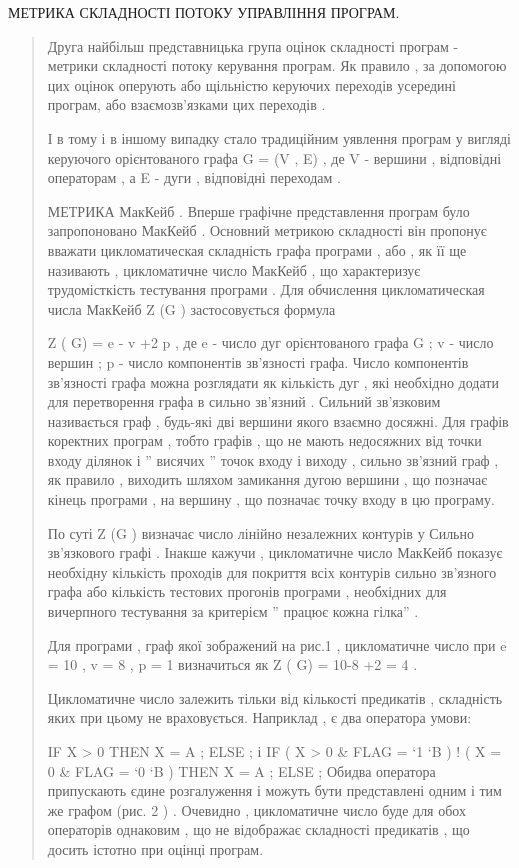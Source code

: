 МЕТРИКА СКЛАДНОСТІ ПОТОКУ УПРАВЛІННЯ ПРОГРАМ.
\begin{quote}

Друга найбільш представницька група оцінок складності програм - метрики складності потоку керування програм. Як правило , за допомогою цих оцінок оперують або щільністю керуючих переходів усередині програм, або взаємозв'язками цих переходів .

І в тому і в іншому випадку стало традиційним уявлення програм у вигляді керуючого орієнтованого графа G = (V , E) , де V - вершини , відповідні операторам , а E - дуги , відповідні переходам .

МЕТРИКА МакКейб .
Вперше графічне представлення програм було запропоновано МакКейб . Основний метрикою складності він пропонує вважати цикломатическая складність графа програми , або , як її ще називають , цикломатичне число МакКейб , що характеризує трудомісткість тестування програми .
Для обчислення цикломатическая числа МакКейб Z (G ) застосовується формула

Z ( G) = e - v +2 p ,
де e - число дуг орієнтованого графа G ;
v - число вершин ;
p - число компонентів зв'язності графа.
Число компонентів зв'язності графа можна розглядати як кількість дуг , які необхідно додати для перетворення графа в сильно зв'язний . Сильний зв'язковим називається граф , будь-які дві вершини якого взаємно досяжні. Для графів коректних програм , тобто графів , що не мають недосяжних від точки входу ділянок і '' висячих '' точок входу і виходу , сильно зв'язний граф , як правило , виходить шляхом замикання дугою вершини , що позначає кінець програми , на вершину , що позначає точку входу в цю програму.

По суті Z (G ) визначає число лінійно незалежних контурів у Сильно зв'язкового графі . Інакше кажучи , цикломатичне число МакКейб показує необхідну кількість проходів для покриття всіх контурів сильно зв'язного графа або кількість тестових прогонів програми , необхідних для вичерпного тестування за критерієм '' працює кожна гілка'' .

Для програми , граф якої зображений на рис.1 , цикломатичне число при e = 10 , v = 8 , p = 1 визначиться як Z ( G) = 10-8 +2 = 4 .

Цикломатичне число залежить тільки від кількості предикатів , складність яких при цьому не враховується. Наприклад , є два оператора умови:

IF X \textgreater{} 0
THEN X = A ;
ELSE ;
і
IF ( X \textgreater{} 0 \& FLAG = `1 `B ) !
( X = 0 \& FLAG = `0 `B )
THEN X = A ;
ELSE ;
Обидва оператора припускають єдине розгалуження і можуть бути представлені одним і тим же графом (рис. 2 ) . Очевидно , цикломатичне число буде для обох операторів однаковим , що не відображає складності предикатів , що досить істотно при оцінці програм.
\end{quote}
